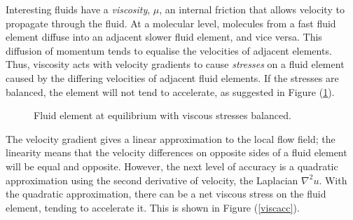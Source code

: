\documentclass[12pt, a4paper, twoside, openright]{book}
\begin{document}
Interesting fluids have a \emph{viscosity}, $\mu$, an internal friction that allows velocity to propagate through the fluid.  At a molecular level, molecules from a fast fluid element diffuse into an adjacent slower fluid element, and vice versa.  This diffusion of momentum tends to equalise the velocities of adjacent elements.  Thus, viscosity acts with velocity gradients to cause \emph{stresses} on a fluid element caused by the differing velocities of adjacent fluid elements.  If the stresses are balanced, the element will not tend to accelerate, as suggested in Figure (\ref{viscbalance}).

\begin{figure}[ht]
\centering
{}
\caption{Fluid element at equilibrium with viscous stresses balanced.}\label{viscbalance}
\end{figure}

The velocity gradient gives a linear approximation to the local flow field;
the linearity means that the velocity differences on opposite sides of a fluid element will be equal and opposite.  However, the next level of accuracy is a quadratic approximation using the second derivative of velocity, the Laplacian $\nabla^2 u$.  With the quadratic approximation, there can be a net viscous stress on the fluid element, tending to accelerate it.  This is shown in Figure (\ref{viscacc}). 
\end{document}
